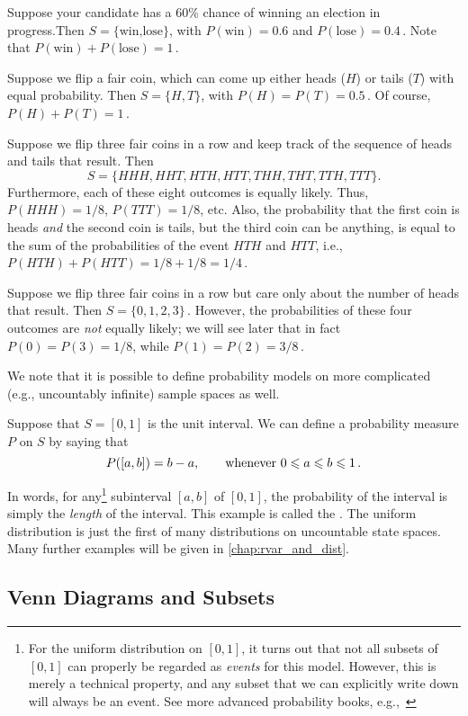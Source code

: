 \begin{example}
    Suppose your candidate has a 60\% chance of winning an election in progress.Then $S=\{\text{win,lose}\}$, with
    $P(\text{win})=0.6$ and $P(\text{lose})=0.4$\,. Note that $P(\text{win})+P(\text{lose})=1$\,.
\end{example}

\begin{example}
    Suppose we flip a fair coin, which can come up either heads ($H$) or tails ($T$) with equal probability. Then
    $S=\{H, T\}$, with $P(H)=P(T)=0.5$\,. Of course, $P(H)+P(T)=1$\,.
\end{example}

\begin{example}
    Suppose we flip three fair coins in a row and keep track of the sequence of heads and tails that result. Then
    $$
    S = \{HHH, HHT, HTH, HTT, THH, THT, TTH, TTT\}.
    $$
    Furthermore, each of these eight outcomes is equally likely. Thus, $P(HHH)=1/8$, $P(TTT)=1/8$, etc. Also, the
    probability that the first coin is heads \emph{and} the second coin is tails, but the third coin can be anything,
    is equal to the sum of the probabilities of the event $HTH$ and $HTT$, i.e., $P(HTH)+P(HTT)=1/8+1/8=1/4$\,.
\end{example}

\begin{example}
    Suppose we flip three fair coins in a row but care only about the number of heads that result. Then
    $S=\{0,1,2,3\}$\,. However, the probabilities of these four outcomes are \emph{not} equally likely; we will see
    later that in fact $P(0)=P(3)=1/8$, while $P(1)=P(2)=3/8$\,.
\end{example}


We note that it is possible to define probability models on more complicated (e.g., uncountably infinite) sample
spaces as well.

\begin{example}
    Suppose that $S=[0,1]$ is the unit interval. We can define a probability measure $P$ on $S$ by saying that
    \begin{equation}
        P([a,b]) = b-a,\qquad \text{whenever $0 \leqslant a \leqslant b \leqslant 1$\,.}
    \end{equation}

    In words, for any\footnote{For the uniform distribution on $[0,1]$, it turns out that not all subsets of $[0,1]$
    can properly be regarded as \emph{events} for this model. However, this is merely a technical property, and any
    subset that we can explicitly write down will always be an event. See more advanced probability books,
    e.g.,~\cite[page 3]{B1}} subinterval $[a,b]$ of $[0,1]$, the probability of the interval is simply the
    \emph{length} of the interval. This example is called the . The uniform
    distribution is just the first of many distributions on uncountable state spaces. Many
    further examples will be given in \autoref{chap:rvar_and_dist}.
\end{example}

\subsection{Venn Diagrams and Subsets}
\lipsum[1-10]

